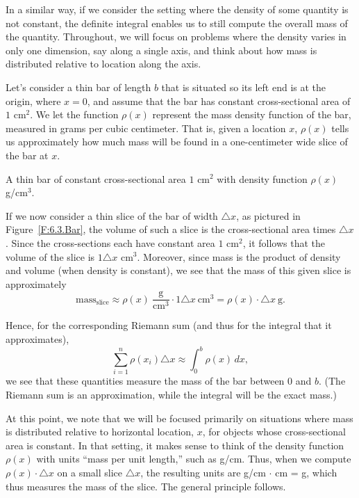In a similar way, if we consider the setting where the density of some quantity is not constant, the definite integral enables us to still compute the overall mass of the quantity.  Throughout, we will focus on problems where the density varies in only one dimension, say along a single axis, and think about how mass is distributed relative to location along the axis.  

Let's consider a thin bar of length $b$ that is situated so its left end is at the origin, where $x = 0$, and assume that the bar has constant cross-sectional area of $1$ cm$^2$.  We let the function $\rho(x)$ represent the mass density function of the bar, measured in grams per cubic centimeter.  That is, given a location $x$, $\rho(x)$ tells us approximately how much mass will be found in a one-centimeter wide slice of the bar at $x$.

\begin{marginfigure} %
\caption{A thin bar of constant cross-sectional area $1$ cm$^2$ with density function $\rho(x)$ g/cm$^3$.} \label{F:6.3.Bar}
\end{marginfigure}

If we now consider a thin slice of the bar of width $\triangle x$, as pictured in Figure~\ref{F:6.3.Bar}, the volume of such a slice is the cross-sectional area times $\triangle x$.  Since the cross-sections each have constant area $1$ cm$^2$, it follows that the volume of the slice is $1 \triangle x$ cm$^3$.  Moreover, since mass is the product of density and volume (when density is constant), we see that the mass of this given slice is approximately
$$\mbox{mass}_{\mbox{slice}} \approx \rho(x) \ \frac{\mbox{g}}{\mbox{cm}^3} \cdot 1 \triangle x \ \mbox{cm}^3 = \rho(x) \cdot \triangle x \ \mbox{g}.$$

Hence, for the corresponding Riemann sum (and thus for the integral that it approximates),
$$\sum_{i=1}^n \rho(x_i) \triangle x \approx \int_0^b \rho(x) \, dx,$$
we see that these quantities measure the mass of the bar between $0$ and $b$.   (The Riemann sum is an approximation, while the integral will be the exact mass.)

At this point, we note that we will be focused primarily on situations where mass is distributed relative to horizontal location, $x$, for objects whose cross-sectional area is constant.  In that setting, it makes sense to think of the density function $\rho(x)$ with units ``mass per unit length,'' such as g/cm.  Thus, when we compute $\rho(x) \cdot \triangle x$ on a small slice $\triangle x$, the resulting units are g/cm $\cdot$ cm = g, which thus measures the mass of the slice.  The general principle follows.


